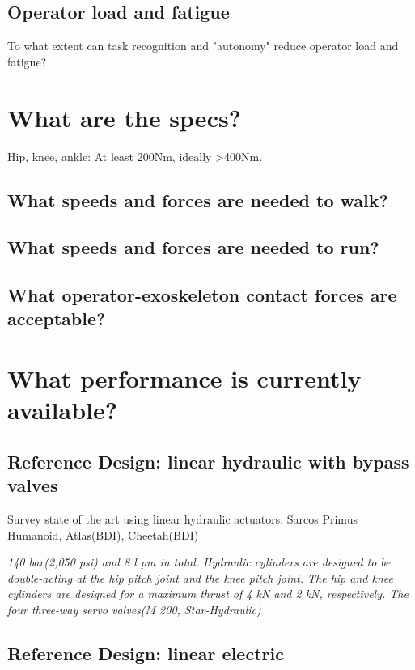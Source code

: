 \documentclass[letterpaper,12pt,fullpage]{article}
\begin{document}
\subsection{Operator load and fatigue}

To what extent can task recognition and "autonomy" reduce operator
load and fatigue?

\section{What are the specs?}

Hip, knee, ankle: At least 200Nm, ideally >400Nm.

\subsection{What speeds and forces are needed to walk?}

\subsection{What speeds and forces are needed to run?}

\subsection{What operator-exoskeleton contact forces are acceptable?}

\section{What performance is currently available?}

\subsection{Reference Design: linear hydraulic with bypass valves}

Survey state of the art using linear hydraulic actuators:
Sarcos Primus Humanoid, Atlas(BDI), Cheetah(BDI)

{\it 140 bar(2,050 psi) and 8 l pm in total. Hydraulic cylinders
are designed to be double-acting at the hip pitch joint and
the knee pitch joint. The hip and knee cylinders are designed
for a maximum thrust of 4 kN and 2 kN, respectively. The
four three-way servo valves(M 200, Star-Hydraulic)}~\cite{IEEE07222598}


\subsection{Reference Design: linear electric}
\end{document}
